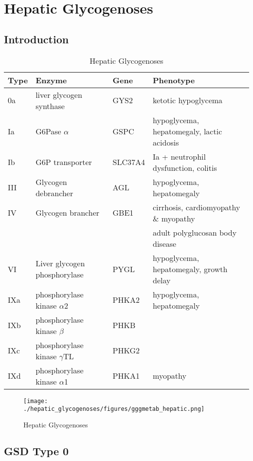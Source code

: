 \documentclass{scrartcl}
\begin{document}
\section{Hepatic Glycogenoses}
\label{sec:org122f23e}
\subsection{Introduction}
\label{sec:org53c79e9}
\begin{table}[htbp]
\caption{\label{tab:org94df006}
Hepatic Glycogenoses}
\centering
\begin{tabular}{llll}
Type & Enzyme & Gene & Phenotype\\
\hline
0a & liver glycogen synthase & GYS2 & ketotic hypoglycema\\
Ia & G6Pase \(\alpha\) & GSPC & hypoglycema, hepatomegaly, lactic acidosis\\
Ib & G6P transporter & SLC37A4 & Ia + neutrophil dysfunction, colitis\\
III & Glycogen debrancher & AGL & hypoglycema, hepatomegaly\\
IV & Glycogen brancher & GBE1 & cirrhosis, cardiomyopathy \& myopathy\\
 &  &  & adult polyglucosan body disease\\
VI & Liver glycogen phosphorylase & PYGL & hypoglycema, hepatomegaly, growth delay\\
IXa & phosphorylase kinase \(\alpha\)2 & PHKA2 & hypoglycema, hepatomegaly\\
IXb & phosphorylase kinase \(\beta\) & PHKB & \\
IXc & phosphorylase kinase \(\gamma\)TL & PHKG2 & \\
IXd & phosphorylase kinase \(\alpha\)1 & PHKA1 & myopathy\\
\end{tabular}
\end{table}

\begin{figure}[htbp]
\centering
\texttt{[image: ./hepatic\_glycogenoses/figures/gggmetab\_hepatic.png]}
\caption[Hepatic Glycogenoses]{\label{fig:orgdb791a4}
Hepatic Glycogenoses}
\end{figure}

\subsection{GSD Type 0}
\label{sec:org584e658}
\end{document}
